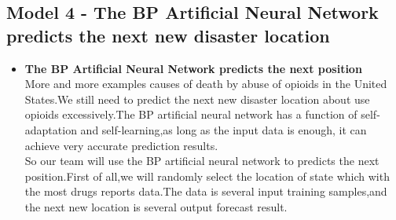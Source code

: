\documentclass{mcmthesis}
\begin{document}
\subsection{Model 4 - The BP Artificial Neural Network predicts the next new disaster location}%
\begin{itemize}
     \item \textbf{The BP Artificial Neural Network predicts the next position} \\%
     More and more examples causes of death by abuse of opioids in the United States.We still need to predict the next new disaster location about use opioids excessively.The BP artificial neural network has a function of self-adaptation and self-learning,as long as the input data is enough, it can achieve very accurate prediction results.\\
     
     So our team will use the BP artificial neural network to  predicts the next position.First of all,we will randomly select the location of state which with the most drugs reports data.The data is several input training samples,and the next new location is several output forecast result. \\
\end{itemize}
\end{document}
